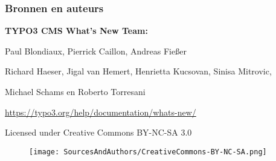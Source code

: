 
\begin{frame}[fragile]
	\frametitle{Bronnen en auteurs}

	\vspace{-0.6cm}

	\centerline{\textbf{TYPO3 CMS What's New Team:}}

	\begin{center}
		\centerline{Paul Blondiaux, Pierrick Caillon, Andreas Fießer}
		\centerline{Richard Haeser, Jigal van Hemert, Henrietta Kucsovan, Sinisa Mitrovic,}
		\centerline{Michael Schams en Roberto Torresani}
	\end{center}

	\vspace{0.6cm}

	\smaller\begin{center}\url{https://typo3.org/help/documentation/whats-new/}\end{center}\normalsize

	\vspace{1cm}

	\smaller\begin{center}Licensed under Creative Commons BY-NC-SA 3.0\end{center}\normalsize
	\begin{figure}\vspace*{-0.4cm}
		\texttt{[image: SourcesAndAuthors/CreativeCommons-BY-NC-SA.png]}
	\end{figure}

\end{frame}

